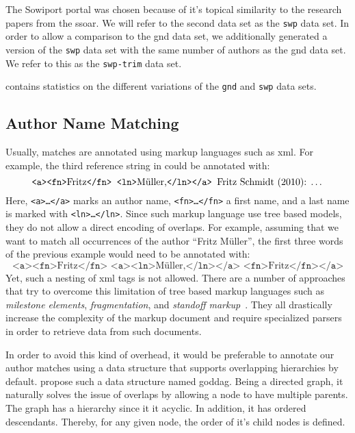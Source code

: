 The Sowiport portal was chosen because of it's topical similarity to the research papers from the \gls{ssoar}.
We will refer to the second data set as the \texttt{swp} data set.
In order to allow a comparison to the \gls{gnd} data set, we additionally generated a version of the \texttt{swp} data set with the same number of authors as the \gls{gnd} data set.
We refer to this as the \texttt{swp-trim} data set.

 contains statistics on the different variations of the \texttt{gnd} and \texttt{swp} data sets.

\subsection{Author Name Matching}\label{subsec:i-author-name-matching}
Usually, matches are annotated using markup languages such as \gls{xml}.
For example, the third reference string in  could be annotated with:
\begin{equation*}
  \texttt{<a><fn>}\text{Fritz}\texttt{</fn> <ln>}\text{M\"{u}ller,}\texttt{</ln></a> }\text{Fritz Schmidt (2010): \dots}
\end{equation*}
Here, \texttt{<a>\dots</a>} marks an author name, \texttt{<fn>\dots</fn>} a first name, and a last name is marked with \texttt{<ln>\dots</ln>}.
Since such markup language use tree based models, they do not allow a direct encoding of overlaps.
For example, assuming that we want to match all occurrences of the author ``Fritz M\"{u}ller'', the first three words of the previous example would need to be annotated with:
\begin{equation*}
  \texttt{<a><fn>}\text{Fritz}\texttt{</fn> <a><ln>}\text{M\"{u}ller,}\texttt{</ln></a> <fn>}\text{Fritz}\texttt{</fn></a>}
\end{equation*}
Yet, such a nesting of \gls{xml} tags is not allowed.
There are a number of approaches that try to overcome this limitation of tree based markup languages such as \textit{milestone elements}, \textit{fragmentation}, and \textit{standoff markup}~\citep{sperberg2000goddag}. They all drastically increase the complexity of the markup document and require specialized parsers in order to retrieve data from such documents.

In order to avoid this kind of overhead, it would be preferable to annotate our author matches using a data structure that supports overlapping hierarchies by default.
\citet{sperberg2000goddag} propose such a data structure named \acrfull{goddag}.
Being a directed graph, it naturally solves the issue of overlaps by allowing a node to have multiple parents.
The graph has a hierarchy since it it acyclic.
In addition, it has ordered descendants.
Thereby, for any given node, the order of it's child nodes is defined.

